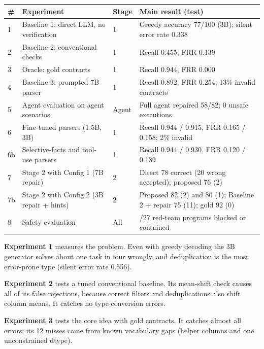 \documentclass[11pt]{article}
\begin{document}
\begin{table}[!tp]
\centering\footnotesize\setlength{\tabcolsep}{3pt}\renewcommand{\arraystretch}{1.1}
\begin{tabularx}{\textwidth}{l>{\raggedright\arraybackslash}Xl>{\raggedright\arraybackslash}X}
\toprule
\textbf{\#} & \textbf{Experiment} & \textbf{Stage} & \textbf{Main result (test)} \\
\midrule
1 & Baseline 1: direct LLM, no verification & 1 & Greedy accuracy 77/100 (3B); silent error rate 0.338 \\
2 & Baseline 2: conventional checks & 1 & Recall 0.455, FRR 0.139 \\
3 & Oracle: gold contracts & 1 & Recall 0.944, FRR 0.000 \\
4 & Baseline 3: prompted 7B parser & 1 & Recall 0.892, FRR 0.254; 13\% invalid contracts \\
5 & Agent evaluation on agent scenarios & Agent & Full agent repaired 58/82; 0 unsafe executions \\
6 & Fine-tuned parsers (1.5B, 3B) & 1 & Recall 0.944 / 0.915, FRR 0.165 / 0.158; 2\% invalid \\
6b & Selective-facts and tool-use parsers & 1 & Recall 0.944 / 0.930, FRR 0.120 / 0.139 \\
7 & Stage 2 with Config 1 (7B repair) & 2 & Direct 78 correct (20 wrong accepted); proposed 76 (2) \\
7b & Stage 2 with Config 2 (3B repair + hints) & 2 & Proposed 82 (2) and 80 (1); Baseline 2 + repair 75 (11); gold 92 (0) \\
8 & Safety evaluation & All & 27/27 red-team programs blocked or contained \\
\bottomrule
\end{tabularx}
\end{table}

\textbf{Experiment 1} measures the problem. Even with greedy decoding
the 3B generator solves about one task in four wrongly, and
deduplication is the most error-prone type (silent error rate 0.556).

\textbf{Experiment 2} tests a tuned conventional baseline. Its
mean-shift check causes all of its false rejections, because correct
filters and deduplications also shift column means. It catches no
type-conversion errors.

\textbf{Experiment 3} tests the core idea with gold contracts. It
catches almost all errors; its 12 misses come from known vocabulary gaps
(helper columns and one unconstrained dtype).
\end{document}
